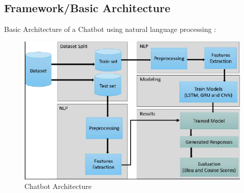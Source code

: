 \documentclass[12pt,a4paper]{report}     %
\begin{document}
\begin{normalsize}
{{{\par



}

\newpage 
\chapter{}
{\setlength{\baselineskip}{1.1\baselineskip}
\section{Framework/Basic Architecture}
Basic Architecture of a Chatbot using natural language processing :
\begin{figure}[htp]
    \centering
    \includegraphics[width=12cm]{architecture.png}
    \caption{Chatbot Architecture}
    \label{fig:architetcture}
\end{figure}
}
}}
\end{normalsize}
\end{document}
